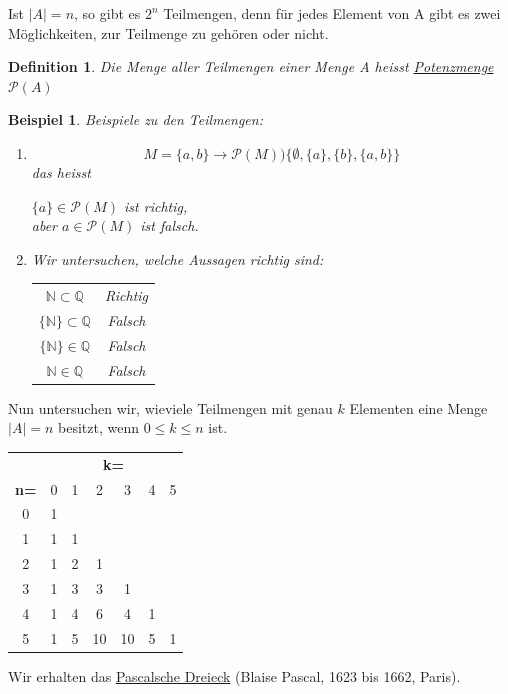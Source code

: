 \documentclass{report}
\newtheorem{mydef}{Definition}
\newtheorem{myexample}{Beispiel}
\begin{document}
Ist $|A|=n$, so gibt es $2^n$ Teilmengen, denn für jedes Element von A gibt es zwei Möglichkeiten, zur Teilmenge zu gehören oder nicht.
\begin{mydef}Die Menge aller Teilmengen einer Menge A heisst \underline{Potenzmenge $\mathcal{P}(A)$}\end{mydef}
\begin{myexample}Beispiele zu den Teilmengen:\begin{enumerate}
\item \begin{equation}M = \{a, b\} \to \mathcal{P}(M) ) \{\emptyset, \{a\}, \{b\}, \{a, b\}\}\end{equation}
das heisst
\begin{center}$\{a\} \in \mathcal{P}(M)$ ist richtig,\\
aber $a \in \mathcal{P}(M)$ ist falsch.\end{center}
\item Wir untersuchen, welche Aussagen richtig sind:
\begin{center}\begin{tabular}{c c}$\mathbb{N} \subset \mathbb{Q}$ & Richtig \\
$\{\mathbb{N}\} \subset \mathbb{Q}$ & Falsch \\
$\{\mathbb{N}\} \in \mathbb{Q} $ & Falsch \\
$\mathbb{N} \in \mathbb{Q}$ & Falsch\end{tabular}\end{center}
\end{enumerate}\end{myexample}
Nun untersuchen wir, wieviele Teilmengen mit genau $k$ Elementen eine Menge $|A| = n$ besitzt, wenn $0 \leq k \leq n$ ist.
\begin{center}
\begin{tabular}{c|c|c|c|c|c|c|}
& \multicolumn{6}{|c|}{\bf k=} \\
{\bf n=}& 0 & 1 & 2 & 3 & 4 &5 \\ \hline
0 & 1 & & & & & \\ \hline
1 & 1 & 1 & & & & \\ \hline
2 & 1 & 2 & 1 & & & \\ \hline
3 & 1 & 3 & 3 & 1 & & \\ \hline
4 & 1 & 4 & 6 & 4 & 1 & \\ \hline
5 & 1 & 5 & 10 & 10 & 5 & 1\\ \hline\end{tabular}
\end{center}Wir erhalten das \underline{Pascalsche Dreieck} (Blaise Pascal, 1623 bis 1662, Paris).
\end{document}

